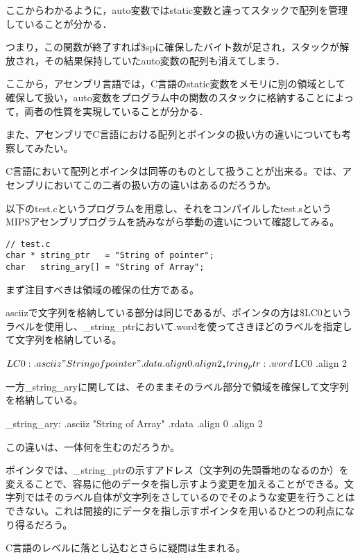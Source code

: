 \documentclass[a4j]{jarticle}
\begin{document}
ここからわかるように，auto変数ではstatic変数と違ってスタックで配列を管理していることが分かる．

つまり，この関数が終了すれば\$spに確保したバイト数が足され，スタックが解放され，その結果保持していたauto変数の配列も消えてしまう．

ここから，アセンブリ言語では，C言語のstatic変数をメモリに別の領域として確保して扱い，auto変数をプログラム中の関数のスタックに格納することによって，両者の性質を実現していることが分かる．


また、アセンブリでC言語における配列とポインタの扱い方の違いについても考察してみたい。

C言語において配列とポインタは同等のものとして扱うことが出来る。では、アセンブリにおいてこの二者の扱い方の違いはあるのだろうか。

以下のtest.cというプログラムを用意し、それをコンパイルしたtest.sというMIPSアセンブリプログラムを読みながら挙動の違いについて確認してみる。

\begin{verbatim}
// test.c
char * string_ptr   = "String of pointer";
char   string_ary[] = "String of Array";
\end{verbatim}

まず注目すべきは領域の確保の仕方である。

asciizで文字列を格納している部分は同じであるが、ポインタの方は\$LC0というラベルを使用し、\_string\_ptrにおいて.wordを使ってさきほどのラベルを指定して文字列を格納している。

\begin{varbatim}
$LC0:
  .asciiz "String of pointer"
  .data
  .align  0
  .align  2
_string_ptr:
  .word $LC0
  .align  2
\end{varbatim}

一方\_string\_aryに関しては、そのままそのラベル部分で領域を確保して文字列を格納している。

\begin{varbatim}
\_string\_ary:
  .asciiz "String of Array"
  .rdata
  .align  0
  .align  2
\end{varbatim}

この違いは、一体何を生むのだろうか。

ポインタでは、\_string\_ptrの示すアドレス（文字列の先頭番地のなるのか）を変えることで、容易に他のデータを指し示すよう変更を加えることができる。文字列ではそのラベル自体が文字列をさしているのでそのような変更を行うことはできない。これは間接的にデータを指し示すポインタを用いるひとつの利点になり得るだろう。

C言語のレベルに落とし込むとさらに疑問は生まれる。
\end{document}
